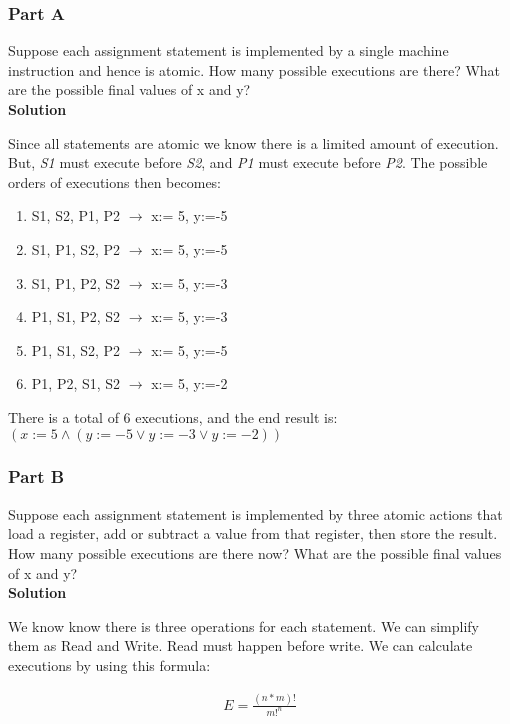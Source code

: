 \subsubsection{Part A}

Suppose each assignment statement is implemented by a single machine instruction and
hence is atomic. How many possible executions are there? What are the possible final
values of x and y? \\

\textbf{Solution}

Since all statements are atomic we know there is a limited amount of execution.
But, \textit{S1} must execute before \textit{S2}, and \textit{P1} must execute before \textit{P2}.
The possible orders of executions then becomes: 

\begin{enumerate}
    \item S1, S2, P1, P2 $\to$ x:= 5, y:=-5  
    \item S1, P1, S2, P2 $\to$ x:= 5, y:=-5
    \item S1, P1, P2, S2 $\to$ x:= 5, y:=-3
    \item P1, S1, P2, S2 $\to$ x:= 5, y:=-3
    \item P1, S1, S2, P2 $\to$ x:= 5, y:=-5
    \item P1, P2, S1, S2 $\to$ x:= 5, y:=-2
\end{enumerate}

There is a total of 6 executions, and the end result is: \\
$(x:=5 \land  (y:=-5 \lor y:=-3 \lor y:=-2))$ 


\subsubsection{Part B}

Suppose each assignment statement is implemented by three atomic actions that load a
register, add or subtract a value from that register, then store the result. How many
possible executions are there now? What are the possible final values of x and y? \\


\textbf{Solution}

We know know there is three operations for each statement. We can simplify them as Read and Write. 
Read must happen before write. We can calculate executions by using this formula:

\begin{align*}
    E = \frac{(n*m)!}{m!^{n}}
\end{align*}


